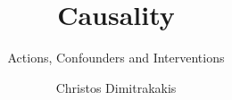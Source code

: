 \documentclass{beamer}
\title{Causality}
\subtitle{Actions, Confounders and Interventions}
\author[C. Dimitrakakis]{Christos Dimitrakakis}
\begin{document}
\begin{frame}
  \titlepage
\end{frame}






\end{document}
